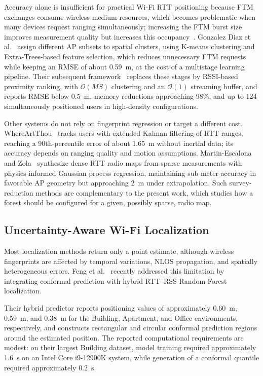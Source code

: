 Accuracy alone is insufficient for practical Wi-Fi RTT positioning because FTM exchanges consume wireless-medium resources, which becomes problematic when many devices request ranging simultaneously; increasing the FTM burst size improves measurement quality but increases this occupancy~\cite{zola2025burst}. Gonzalez Diaz et al.~\cite{gonzalezdiaz2024stdclustering} assign different AP subsets to spatial clusters, using K-means clustering and Extra-Trees-based feature selection, which reduces unnecessary FTM requests while keeping an RMSE of about 0.59~m, at the cost of a multistage learning pipeline. Their subsequent framework~\cite{gonzalezdiaz2026scalable} replaces these stages by RSSI-based proximity ranking, with $\mathcal{O}(MS)$ clustering and an $\mathcal{O}(1)$ streaming buffer, and reports RMSE below 0.5~m, memory reductions approaching 98\%, and up to 124 simultaneously positioned users in high-density configurations.

Other systems do not rely on fingerprint regression or target a different cost. WhereArtThou~\cite{jurdi2024whereartthou} tracks users with extended Kalman filtering of RTT ranges, reaching a 90th-percentile error of about 1.65~m without inertial data; its accuracy depends on ranging quality and motion assumptions. Martin-Escalona and Zola~\cite{martinescalona2026surveyfree} synthesize dense RTT radio maps from sparse measurements with physics-informed Gaussian process regression, maintaining sub-meter accuracy in favorable AP geometry but approaching 2~m under extrapolation. Such survey-reduction methods are complementary to the present work, which studies how a forest should be configured for a given, possibly sparse, radio map.

\subsection{Uncertainty-Aware Wi-Fi Localization}
\label{subsec:rw_uncertainty}

Most localization methods return only a point estimate, although wireless fingerprints are affected by temporal variations, NLOS propagation, and spatially heterogeneous errors. Feng et al.~\cite{feng2026robust} recently addressed this limitation by integrating conformal prediction with hybrid RTT--RSS Random Forest localization.

Their hybrid predictor reports positioning values of approximately 0.60~m, 0.59~m, and 0.38~m for the Building, Apartment, and Office environments, respectively, and constructs rectangular and circular conformal prediction regions around the estimated position. The reported computational requirements are modest: on their largest Building dataset, model training required approximately 1.6~s on an Intel Core i9-12900K system, while generation of a conformal quantile required approximately 0.2~s.

